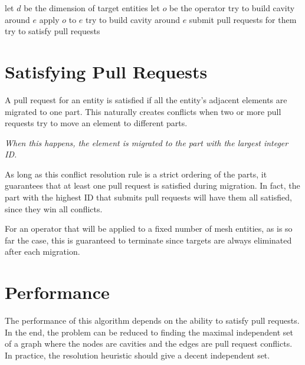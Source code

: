\documentclass{article}
\begin{document}
\begin{algorithmic}
\State let $d$ be the dimension of target entities
\State let $o$ be the operator
\Loop
      \State try to build cavity around $e$
        \State apply $o$ to $e$
      \EndIf
    \EndIf
  \EndFor
      \State try to build cavity around $e$
        \State submit pull requests for them
      \EndIf
    \EndIf
  \EndFor
    \Return
  \EndIf
  \State try to satisfy pull requests
\EndLoop
\EndFunction
\end{algorithmic}

\section{Satisfying Pull Requests}

A pull request for an entity is satisfied if all the
entity's adjacent elements are migrated to one part.
This naturally creates conflicts when two or more pull requests
try to move an element to different parts.

\emph{When this happens, the element is migrated to the part
with the largest integer ID.}

As long as this conflict resolution rule is a strict
ordering of the parts, it guarantees that at least
one pull request is satisfied during migration.
In fact, the part with the highest ID that submits
pull requests will have them all satisfied, since
they win all conflicts.

For an operator that will be applied to a fixed
number of mesh entities, as is so far the case,
this is guaranteed to terminate since
targets are always eliminated after each migration.

\section{Performance}

The performance of this algorithm depends on
the ability to satisfy pull requests.
In the end, the problem can be reduced
to finding the maximal independent set
of a graph where the nodes are cavities 
and the edges are pull request conflicts.
In practice, the resolution heuristic should give
a decent independent set.
\end{document}
